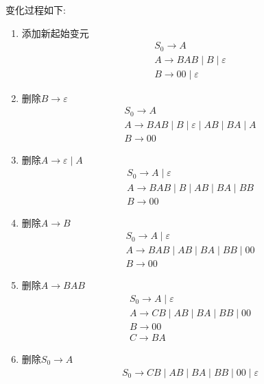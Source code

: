 \documentclass[UTF8]{report}
\newenvironment{solution}{{\noindent\hskip 2em \bf 解 \quad}}{}
\begin{document}
\begin{solution}
    变化过程如下:
    \begin{enumerate}
        \item 添加新起始变元
        \begin{align*}
            &S_0 \rightarrow A\\
            &A \rightarrow BAB \mid B \mid \varepsilon\\
            &B \rightarrow 00 \mid \varepsilon
        \end{align*}
        \item 删除$B\rightarrow \varepsilon$
        \begin{align*}
            &S_0 \rightarrow A\\
            &A \rightarrow BAB \mid B \mid \varepsilon \mid AB \mid BA \mid A\\
            &B \rightarrow 00
        \end{align*}
        \item 删除$A\rightarrow \varepsilon \mid A$
        \begin{align*}
            &S_0 \rightarrow A \mid \varepsilon\\ 
            &A \rightarrow BAB \mid B \mid AB \mid BA \mid BB\\
            &B \rightarrow 00
        \end{align*}
        \item 删除$A\rightarrow B$
        \begin{align*}
            &S_0 \rightarrow A \mid \varepsilon\\ 
            &A \rightarrow BAB \mid AB \mid BA \mid BB \mid 00\\
            &B \rightarrow 00
        \end{align*}
        \item 删除$A\rightarrow BAB$
        \begin{align*}
            &S_0 \rightarrow A \mid \varepsilon\\ 
            &A \rightarrow CB \mid AB \mid BA \mid BB \mid 00\\
            &B \rightarrow 00\\
            &C \rightarrow BA
        \end{align*}
        \item 删除$S_0\rightarrow A$
        \begin{align*}
            &S_0 \rightarrow CB \mid AB \mid BA \mid BB \mid 00 \mid \varepsilon\\ 

\end{align*}
\end{enumerate}
\end{solution}
\end{document}
